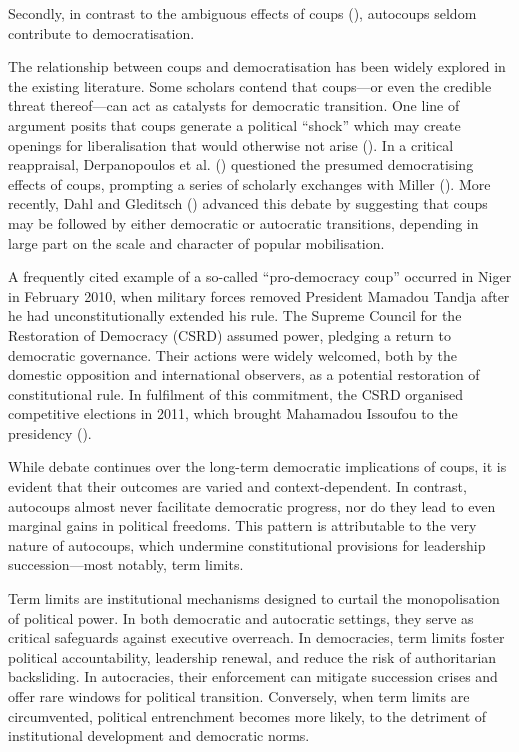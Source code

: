 \documentclass[
  12pt,
]{report}
\begin{document}
Secondly, in contrast to the ambiguous effects of coups
(), autocoups seldom
contribute to democratisation.

The relationship between coups and democratisation has been widely
explored in the existing literature. Some scholars contend that
coups---or even the credible threat thereof---can act as catalysts for
democratic transition. One line of argument posits that coups generate a
political ``shock'' which may create openings for liberalisation that
would otherwise not arise (). In a critical reappraisal, Derpanopoulos et al.
() questioned the presumed
democratising effects of coups, prompting a series of scholarly
exchanges with Miller (). More recently,
Dahl and Gleditsch () advanced this debate
by suggesting that coups may be followed by either democratic or
autocratic transitions, depending in large part on the scale and
character of popular mobilisation.

A frequently cited example of a so-called ``pro-democracy coup''
occurred in Niger in February 2010, when military forces removed
President Mamadou Tandja after he had unconstitutionally extended his
rule. The Supreme Council for the Restoration of Democracy (CSRD)
assumed power, pledging a return to democratic governance. Their actions
were widely welcomed, both by the domestic opposition and international
observers, as a potential restoration of constitutional rule. In
fulfilment of this commitment, the CSRD organised competitive elections
in 2011, which brought Mahamadou Issoufou to the presidency
().

While debate continues over the long-term democratic implications of
coups, it is evident that their outcomes are varied and
context-dependent. In contrast, autocoups almost never facilitate
democratic progress, nor do they lead to even marginal gains in
political freedoms. This pattern is attributable to the very nature of
autocoups, which undermine constitutional provisions for leadership
succession---most notably, term limits.

Term limits are institutional mechanisms designed to curtail the
monopolisation of political power. In both democratic and autocratic
settings, they serve as critical safeguards against executive overreach.
In democracies, term limits foster political accountability, leadership
renewal, and reduce the risk of authoritarian backsliding. In
autocracies, their enforcement can mitigate succession crises and offer
rare windows for political transition. Conversely, when term limits are
circumvented, political entrenchment becomes more likely, to the
detriment of institutional development and democratic norms.
\end{document}
